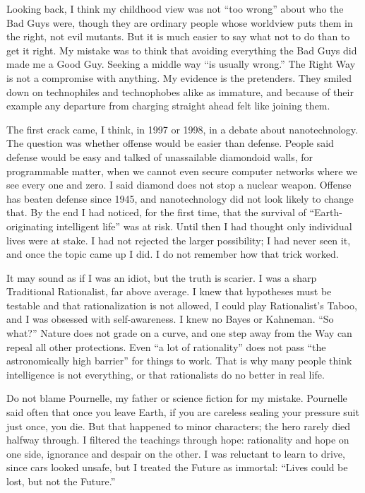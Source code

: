 Looking back, I think my childhood view was not ``too wrong'' about who the Bad Guys were, though they are ordinary people whose worldview puts them in the right, not evil mutants. But it is much easier to say what not to do than to get it right. My mistake was to think that avoiding everything the Bad Guys did made me a Good Guy. Seeking a middle way ``is usually wrong.'' The Right Way is not a compromise with anything. My evidence is the pretenders. They smiled down on technophiles and technophobes alike as immature, and because of their example any departure from charging straight ahead felt like joining them.

The first crack came, I think, in 1997 or 1998, in a debate about nanotechnology. The question was whether offense would be easier than defense. People said defense would be easy and talked of unassailable diamondoid walls, for programmable matter, when we cannot even secure computer networks where we see every one and zero. I said diamond does not stop a nuclear weapon. Offense has beaten defense since 1945, and nanotechnology did not look likely to change that. By the end I had noticed, for the first time, that the survival of ``Earth-originating intelligent life'' was at risk.  Until then I had thought only individual lives were at stake. I had not rejected the larger possibility; I had never seen it, and once the topic came up I did. I do not remember how that trick worked.

It may sound as if I was an idiot, but the truth is scarier. I was a sharp Traditional Rationalist, far above average. I knew that hypotheses must be testable and that rationalization is not allowed, I could play Rationalist's Taboo, and I was obsessed with self-awareness. I knew no Bayes or Kahneman. ``So what?'' Nature does not grade on a curve, and one step away from the Way can repeal all other protections. Even ``a lot of rationality'' does not pass ``the astronomically high barrier'' for things to work. That is why many people think intelligence is not everything, or that rationalists do no better in real life. 

Do not blame Pournelle, my father or science fiction for my mistake. Pournelle said often that once you leave Earth, if you are careless sealing your pressure suit just once, you die. But that happened to minor characters; the hero rarely died halfway through. I filtered the teachings through hope: rationality and hope on one side, ignorance and despair on the other. I was reluctant to learn to drive, since cars looked unsafe, but I treated the Future as immortal: ``Lives could be lost, but not the Future.''

